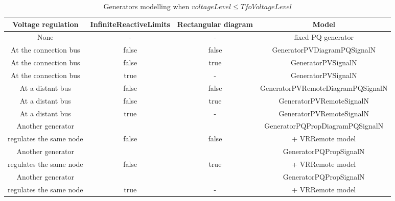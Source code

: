 \documentclass[a4paper, 12pt]{report}
\begin{document}
\begin{table}[h!]
\center
\begin{tabular}{ c | c | c | c}
\toprule
\scriptsize{\textbf{{Voltage regulation}}} & \scriptsize{\textbf{{InfiniteReactiveLimits}}} & \scriptsize{\textbf{{Rectangular diagram}}} & \scriptsize{\textbf{{Model}}}\\
\midrule
\rowcolor{white}
 \scriptsize{None}  & \scriptsize{-} & \scriptsize{-} & \scriptsize{fixed PQ generator} \\
\rowcolor{gray!10}
 \scriptsize{At the connection bus} & \scriptsize{false} & \scriptsize{false} & \scriptsize{GeneratorPVDiagramPQSignalN} \\
\rowcolor{white}
 \scriptsize{At the connection bus} & \scriptsize{false} & \scriptsize{true} & \scriptsize{GeneratorPVSignalN} \\
\rowcolor{gray!10}
 \scriptsize{At the connection bus} & \scriptsize{true} & \scriptsize{-} & \scriptsize{GeneratorPVSignalN} \\
\rowcolor{white}
 \scriptsize{At a distant bus} & \scriptsize{false} & \scriptsize{false} & \scriptsize{GeneratorPVRemoteDiagramPQSignalN} \\
\rowcolor{gray!10}
 \scriptsize{At a distant bus} & \scriptsize{false} & \scriptsize{true} & \scriptsize{GeneratorPVRemoteSignalN} \\
\rowcolor{white}
 \scriptsize{At a distant bus} & \scriptsize{true} & \scriptsize{-} & \scriptsize{GeneratorPVRemoteSignalN} \\
\rowcolor{gray!10}
\scriptsize{Another generator}&  &  & \scriptsize{GeneratorPQPropDiagramPQSignalN}\\
\rowcolor{gray!10}
\scriptsize{regulates the same node} & \multirow{-2}{*}{\scriptsize{false}} & \multirow{-2}{*}{\scriptsize{false}} & \scriptsize{+ VRRemote model} \\
\rowcolor{white}
\scriptsize{Another generator}&  &  & \scriptsize{GeneratorPQPropSignalN}\\
\rowcolor{white}
\scriptsize{regulates the same node} & \multirow{-2}{*}{\scriptsize{false}} & \multirow{-2}{*}{\scriptsize{true}} & \scriptsize{+ VRRemote model} \\
\rowcolor{gray!10}
\scriptsize{Another generator}&  & & \scriptsize{GeneratorPQPropSignalN}  \\
\rowcolor{gray!10}
\scriptsize{regulates the same node} & \multirow{-2}{*}{\scriptsize{true}} & \multirow{-2}{*}{\scriptsize{-}} & \scriptsize{+ VRRemote model} \\
\bottomrule
\end{tabular}
\caption{Generators modelling when $voltageLevel \leq TfoVoltageLevel$}
\label{tab:generators_modelling}
\end{table}
\end{document}

